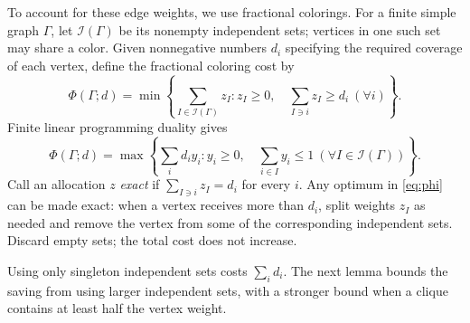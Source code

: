 \documentclass[10pt]{article}
\theoremstyle{remark}
\newcommand{\calI}{\mathcal{I}}
\begin{document}
To account for these edge weights, we use fractional colorings. For a finite simple graph $\Gamma$, let $\calI(\Gamma)$ be its nonempty independent sets; vertices in one such set may share a color. Given nonnegative numbers $d_i$ specifying the required coverage of each vertex, define the fractional coloring cost by
\begin{equation}\label{eq:phi}
 \Phi(\Gamma;d)=\min\left\{\sum_{I\in\calI(\Gamma)}z_I:
 z_I\ge0,\quad\sum_{I\ni i}z_I\ge d_i\ (\forall i)\right\}.
\end{equation}
Finite linear programming duality gives
\begin{equation}\label{eq:phidual}
 \Phi(\Gamma;d)=\max\left\{\sum_i d_iy_i:y_i\ge0,
 \quad\sum_{i\in I}y_i\le1\ (\forall I\in\calI(\Gamma))\right\}.
\end{equation}
Call an allocation $z$ \emph{exact} if $\sum_{I\ni i}z_I=d_i$ for every $i$. Any optimum in \eqref{eq:phi} can be made exact: when a vertex receives more than $d_i$, split weights $z_I$ as needed and remove the vertex from some of the corresponding independent sets. Discard empty sets; the total cost does not increase.

Using only singleton independent sets costs $\sum_i d_i$. The next lemma bounds the saving from using larger independent sets, with a stronger bound when a clique contains at least half the vertex weight.
\end{document}
